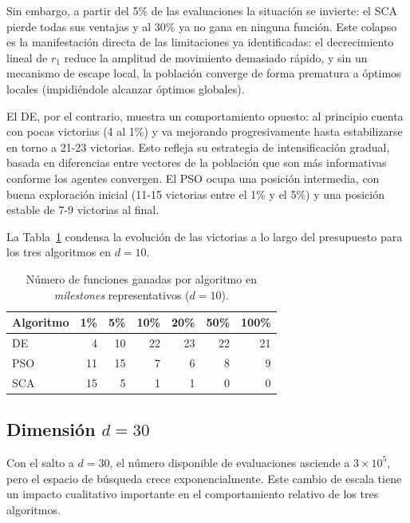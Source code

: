 \documentclass[12pt,a4paper]{article}
\begin{document}
Sin embargo, a partir del 5\% de las evaluaciones la situación se invierte: el SCA pierde todas sus ventajas y al 30\% ya no gana en ninguna función. Este colapso es la manifestación directa de las limitaciones ya identificadas: el decrecimiento lineal de $r_1$ reduce la amplitud de movimiento demasiado rápido, y sin un mecanismo de escape local, la población converge de forma prematura a óptimos locales (impidiéndole alcanzar óptimos globales).
 
El DE, por el contrario, muestra un comportamiento opuesto: al principio cuenta con pocas victorias (4 al 1\%) y va mejorando progresivamente hasta estabilizarse en torno a 21-23 victorias. Esto refleja su estrategia de intensificación gradual, basada en diferencias entre vectores de la población que son más informativas conforme los agentes convergen. El PSO ocupa una posición intermedia, con buena exploración inicial (11-15 victorias entre el 1\% y el 5\%) y una posición estable de 7-9 victorias al final.

La Tabla~\ref{tab:resumen_victorias_d10} condensa la evolución de las victorias a lo largo del presupuesto para los tres algoritmos en $d=10$.

\begin{table}[H]
\centering
\caption{Número de funciones ganadas por algoritmo en \textit{milestones} representativos ($d=10$).}
\label{tab:resumen_victorias_d10}
\renewcommand{\arraystretch}{1.2}
\begin{tabular}{lrrrrrr}
\toprule
\textbf{Algoritmo} & \textbf{1\%} & \textbf{5\%} & \textbf{10\%} & \textbf{20\%} & \textbf{50\%} & \textbf{100\%} \\
\midrule
DE  &  4 & 10 & 22 & 23 & 22 & 21 \\
PSO & 11 & 15 &  7 &  6 &  8 &  9 \\
SCA & 15 &  5 &  1 &  1 &  0 &  0 \\
\bottomrule
\end{tabular}
\end{table}
 
\subsection{Dimensión $d = 30$}
 
Con el salto a $d=30$, el número disponible de evaluaciones asciende a $3 \times 10^5$, pero el espacio de búsqueda crece exponencialmente. Este cambio de escala tiene un impacto cualitativo importante en el comportamiento relativo de los tres algoritmos.
 
\end{document}
